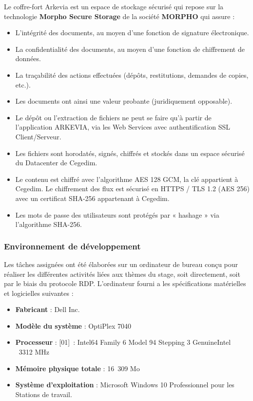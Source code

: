 Le coffre-fort Arkevia est un espace de stockage sécurisé qui repose sur la technologie \textbf{Morpho Secure Storage} de la société \textbf{MORPHO} qui assure :
\begin{itemize}
    \item L'intégrité des documents, au moyen d’une fonction de signature électronique.
    \item La confidentialité des documents, au moyen d’une fonction de chiffrement de données.
    \item La traçabilité des actions effectuées (dépôts, restitutions, demandes de copies, etc.).
    \item Les documents ont ainsi une valeur probante (juridiquement opposable).\\
\end{itemize}
\begin{itemize}[leftmargin=*]
    \item[\textcolor{green5!30!white}{\faCheckCircleO}] Le dépôt ou l'extraction de fichiers ne peut se faire qu'à partir de l'application ARKEVIA, via les Web Services avec authentification SSL Client/Serveur.
    \item[\textcolor{green5!30!white}{\faCheckCircleO}] Les fichiers sont horodatés, signés, chiffrés et stockés dans un espace sécurisé du Datacenter de Cegedim.
    \item[\textcolor{green5!30!white}{\faCheckCircleO}] Le contenu est chiffré avec l'algorithme AES 128 GCM, la clé appartient à Cegedim. Le chiffrement des flux est sécurisé en HTTPS / TLS 1.2 (AES 256) avec un certificat SHA-256 appartenant à Cegedim.
    \item[\textcolor{green5!30!white}{\faCheckCircleO}] Les mots de passe des utilisateurs sont protégés par « hashage » via l'algorithme SHA-256.
\end{itemize}
\subsubsection{Environnement de développement}
Les tâches assignées ont été élaborées sur un ordinateur de bureau conçu pour réaliser les différentes activités liées aux thèmes du stage, soit directement, soit par le biais du protocole RDP. L'ordinateur fourni a les spécifications matérielles et logicielles suivantes :
\begin{itemize}
    \item \textbf{Fabricant} : Dell Inc.
    \item \textbf{Modèle du système} : OptiPlex 7040
    \item \textbf{Processeur} : [01] : Intel64 Family 6 Model 94 Stepping 3 GenuineIntel ~3312 MHz
    \item \textbf{Mémoire physique totale} :  16 309 Mo
    \item \textbf{Système d’exploitation} : Microsoft Windows 10 Professionnel pour les Stations de travail.
\end{itemize}

